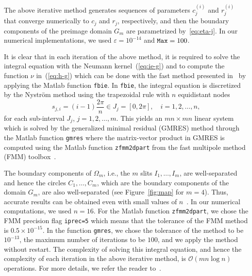 The above iterative method generates sequences of parameters $c^{(i)}_j$ and $r^{(i)}_j$ that converge numerically to $c_j$ and $r_j$, respectively, and then the boundary components of the preimage domain $G_m$ are parametrized by~\eqref{eq:eta-j}. In our numerical implementations, we used $\varepsilon=10^{-14}$ and ${\tt Max}=100$.


It is clear that in each iteration of the above method, it is required to solve the integral equation with the Neumann kernel~(\ref{eq:ie-g}) and to compute the function $\nu$ in~(\ref{eq:h-g}) which can be done with the fast method presented in~\cite{Nas-ETNA} by applying the {\sc Matlab} function \verb|fbie|. In \verb|fbie|, the integral equation is discretized by the Nystr\"om method using the trapezoidal rule with $n$ equidistant nodes
\begin{equation}\label{eq:sji}
	s_{j,i}=(i-1)\frac{2\pi}{n}\in J_j=[0,2\pi], \quad i=1,2,\ldots,n, 
\end{equation}
for each sub-interval $J_j$, $j=1,2,\ldots,m$.
This yields an $mn\times mn$ linear system which is solved by the generalized minimal residual (GMRES) method through the {\sc Matlab} function \verb|gmres| where the matrix-vector product in GMRES is computed using the {\sc Matlab} function \verb|zfmm2dpart| from the fast multipole method (FMM) toolbox~\cite{Gre-Gim12}. 

The boundary components of $\Omega_m$, i.e., the $m$ slits $I_1,\ldots,I_m$, are well-separated and hence the circles $C_1,\ldots,C_m$, which are the boundary components of the domain $G_m$, are also well-separated (see Figure~\ref{fig:map} for $m=4$). Thus, accurate results can be obtained even with small values of $n$~\cite{Nvm}. 
In our numerical computations, we used $n=16$.
For the {\sc Matlab} function \verb|zfmm2dpart|, we chose the FMM precision flag \verb|iprec=5| which means that the tolerance of the FMM method is $0.5\times10^{-15}$. 
In the function \verb|gmres|, we chose the tolerance of the method to be $10^{-13}$, the maximum number of iterations to be $100$, and we apply the method without restart. The complexity of solving this integral equation, and hence the complexity of each iteration in the above iterative method, is $\mathcal{O}(mn\log n)$ operations.
For more details, we refer the reader to~\cite{Nas-ETNA}.



